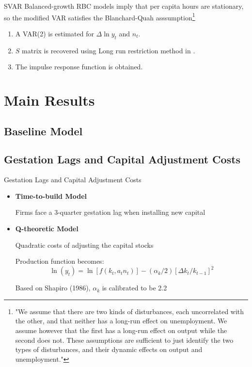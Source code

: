 \documentclass[10pt]{beamer}
\begin{document}
\begin{frame}{SVAR}
    Balanced-growth RBC models imply that per capita hours are stationary, so the modified VAR satisfies the Blanchard-Quah asssumption\footnote{"We assume that there are two kinds of disturbances, each uncorrelated with the other, and that neither has a long-run effect on unemployment. We assume however that the first has a long-run effect on output while the second does not. These assumptions are sufficient to just identify the two types of disturbances, and their dynamic effects on output and unemployment."}
    \begin{enumerate}
        \item A VAR(2) is estimated for $\Delta \ln y_t$ and $n_t$.
        \item $S$ matrix is recovered using Long run restriction method in \cite{blanchard_quah_1988}.
        \item The impulse response function is obtained.
    \end{enumerate} 

\end{frame}


\section{Main Results}
\subsection{Baseline Model}

\subsection{Gestation Lags and Capital Adjustment Costs}

\begin{frame}{Gestation Lags and Capital Adjustment Costs}

    \begin{itemize}
        \item \textbf{Time-to-build Model}

              Firms face a 3-quarter gestation lag when installing new capital

        \item \textbf{Q-theoretic Model}

              Quadratic costs of adjusting the capital stocks

              Production function becomes: $$ \ln \left(y_t\right)= \ln \left[f\left(k_t, a_t
                      n_t\right)\right] -\left(\alpha_{k} / 2\right)\left[\Delta k_t /
                      k_{t-1}\right]^2 $$

              Based on Shapiro (1986), $\alpha_{k}$ is calibrated to be 2.2
    \end{itemize}

\end{frame}
\end{document}
